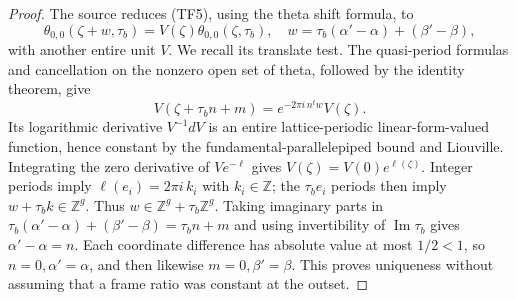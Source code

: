 \begin{proof}
The source reduces (TF5), using the theta shift formula, to
\[
 \theta_{0,0}(\zeta+w,\tau_b)
                    =V(\zeta)\theta_{0,0}(\zeta,\tau_b),
 \quad w=\tau_b(\alpha'-\alpha)+(\beta'-\beta),
\]
with another entire unit \(V\).
We recall its translate test.  The quasi-period formulas and
cancellation on the nonzero open set of theta, followed by
the identity theorem, give
\[
 V(\zeta+\tau_bn+m)=e^{-2\pi i\,n^tw}V(\zeta).
\]
Its logarithmic derivative \(V^{-1}dV\) is an entire
lattice-periodic linear-form-valued function, hence constant
by the fundamental-parallelepiped bound and Liouville.
Integrating the zero derivative of \(V e^{-\ell}\) gives
\(V(\zeta)=V(0)e^{\ell(\zeta)}\).
Integer periods imply
\(\ell(e_i)=2\pi i\,k_i\) with \(k_i\in\mathbb Z\);
the \(\tau_be_i\) periods then imply
\(w+\tau_bk\in\mathbb Z^g\).
Thus \(w\in\mathbb Z^g+\tau_b\mathbb Z^g\).
Taking imaginary parts in
\(\tau_b(\alpha'-\alpha)+(\beta'-\beta)=\tau_bn+m\)
and using invertibility of \(\operatorname{Im}\tau_b\)
gives \(\alpha'-\alpha=n\).
Each coordinate difference has absolute value at most
\(1/2<1\), so \(n=0,\alpha'=\alpha\), and then likewise
\(m=0,\beta'=\beta\).
This proves uniqueness without assuming that a frame ratio
was constant at the outset.
\end{proof}

